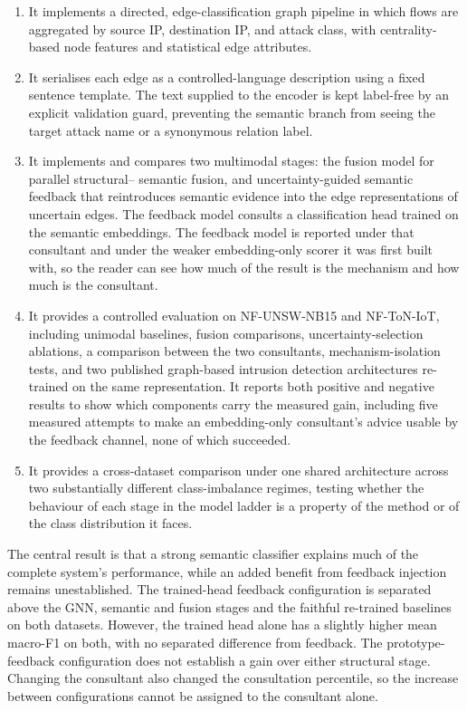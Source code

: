 \begin{enumerate}
    \item It implements a directed, edge-classification graph pipeline in which flows are
    aggregated by source IP, destination IP, and attack class, with centrality-based node
    features and statistical edge attributes.

    \item It serialises each edge as a controlled-language description using a fixed sentence template. The text supplied to the encoder is kept
    label-free by an explicit validation guard, preventing the semantic branch from seeing
    the target attack name or a synonymous relation label.

    \item It implements and compares two multimodal stages: the fusion model for parallel structural--
    semantic fusion, and uncertainty-guided semantic feedback that reintroduces semantic
    evidence into the edge representations of uncertain edges. The feedback model consults
    a classification head trained on the semantic embeddings. The feedback model is reported under that
    consultant and under the weaker embedding-only scorer it was first built with, so the
    reader can see how much of the result is the mechanism and how much is the consultant.

    \item It provides a controlled evaluation on NF-UNSW-NB15 and NF-ToN-IoT, including
    unimodal baselines, fusion comparisons, uncertainty-selection ablations, a comparison
    between the two consultants, mechanism-isolation tests, and two published graph-based
    intrusion detection architectures re-trained on the same representation. It reports both
    positive and negative results to show which components carry the measured gain,
    including five measured attempts to make an embedding-only consultant's advice usable
    by the feedback channel, none of which succeeded.

    \item It provides a cross-dataset comparison under one shared architecture across two
    substantially different class-imbalance regimes, testing whether the behaviour of each
    stage in the model ladder is a property of the method or of the class distribution it
    faces.
\end{enumerate}

The central result is that a strong semantic classifier explains much of the complete system's performance, while an added benefit from feedback injection remains unestablished. The trained-head feedback configuration is separated above the GNN, semantic and fusion stages and the faithful re-trained baselines on both datasets. However, the trained head alone has a slightly higher mean macro-F1 on both, with no separated difference from feedback. The prototype-feedback configuration does not establish a gain over either structural stage. Changing the consultant also changed the consultation percentile, so the increase between configurations cannot be assigned to the consultant alone.

